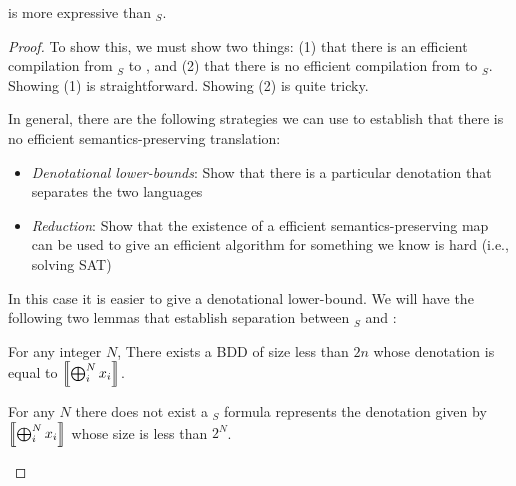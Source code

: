 \documentclass{tufte-handout}
\begin{document}
\begin{theorem}
  \bdd{} is more expressive than \prop$_S$.
\end{theorem}
\begin{proof}
  To show this, we must show two things: (1) that there is an efficient 
  compilation from \prop$_S$ to \bdd{}, and (2) that there is no efficient
  compilation from \bdd{} to \prop$_S$. Showing (1) is straightforward.
  Showing (2) is quite tricky.

  In general, there are the following strategies we can use to establish that there 
  is no efficient semantics-preserving translation:
  \begin{itemize}
    \item \emph{Denotational lower-bounds}: Show that there is a particular denotation
    that separates the two languages
    \item \emph{Reduction}: Show that the existence of a efficient
    semantics-preserving map can be used to give an efficient algorithm for something 
    we know is hard (i.e., solving SAT)
  \end{itemize}

In this case it is easier to give a denotational lower-bound.
We will have the following two lemmas that establish separation
between \prop$_S${} and \bdd{}:
\begin{lemma}
  For any integer $N$, There exists a BDD of size less than $2n$ whose
  denotation is equal to $\left \llbracket {\bigoplus_i^N x_i} \right \rrbracket$.
\end{lemma}
\begin{lemma}
  For any $N$ there does not exist a \prop$_S$ formula
  represents the denotation given by $\left \llbracket {\bigoplus_i^N x_i} \right \rrbracket$ 
  whose size is less than $2^N$.
\end{lemma}

\end{proof}
\end{document}
